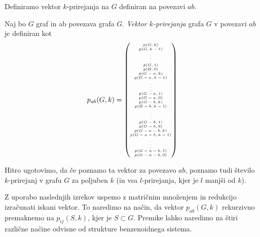 \documentclass[mat1, tisk]{fmfdelo}
\begin{document}
Definiramo vektor $k$-prirejanja na $G$ definiran na povezavi $ab$. 

\begin{definicija}
  Naj bo $G$ graf in ab povezava grafa $G$.
  \emph{Vektor $k$-prirejanja} grafa $G$ v povezavi $ab$ je definiran kot 
  $$p_{ab}(G,k) =
  \tiny
  \begin{pmatrix}
     p(G,k) \\
     p(G,k-1) \\
     \vdots \\
     p(G, 1) \\
     p(G, 0) \\
     p(G - a, k) \\
     p(G - a, k-1) \\
     \vdots \\
     p(G - a, 1) \\
     p(G - a, 0) \\
     p(G - b, k) \\
     p(G - b, k-1) \\
     \vdots \\
     p(G - b, 1) \\
     p(G - b, 0) \\
     p(G - a - b, k) \\
     p(G - a - b, k-1) \\
     \vdots \\
     p(G - a - b, 1) \\
     p(G - a - b, 0) \\
  \end{pmatrix} $$
\end{definicija}

Hitro ugotovimo, da če poznamo ta vektor za povezavo $ab$, 
poznamo tudi število $k$-prirejanj v grafu $G$ za poljuben $k$ 
(in vsa $l$-prirejanja, kjer je $l$ manjši od $k$).


Z uporabo naslednjih izrekov uspemo z 
matričnim množenjem in redukcijo izračunati iskani vektor.
To naredimo na način, da vektor $p_{ab}(G,k)$ rekurzivno premaknemo 
na $p_{ij}(S,k)$, kjer je $S \subset G$. 
Premike lahko naredimo na štiri različne načine
odvisne od strukture benzenoidnega sistema.
\end{document}
